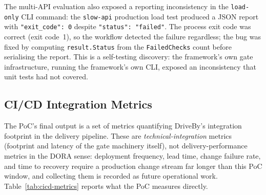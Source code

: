 The multi-API evaluation also exposed a reporting inconsistency in the \texttt{load-only} CLI command: the \texttt{slow-api} production load test produced a JSON report with \texttt{"exit\_code": 0} despite \texttt{"status": "failed"}. The process exit code was correct (exit code~1), so the workflow detected the failure regardless; the bug was fixed by computing \texttt{result.Status} from the \texttt{FailedChecks} count before serialising the report. This is a self-testing discovery: the framework's own gate infrastructure, running the framework's own CLI, exposed an inconsistency that unit tests had not covered.

\subsection{CI/CD Integration Metrics}
\label{sec:cicd-metrics}

The PoC's final output is a set of metrics quantifying DriveBy's integration footprint in the delivery pipeline. These are \emph{technical-integration} metrics (footprint and latency of the gate machinery itself), not delivery-performance metrics in the DORA sense: deployment frequency, lead time, change failure rate, and time to recovery require a production change stream far longer than this PoC window, and collecting them is recorded as future operational work. Table~\ref{tab:cicd-metrics} reports what the PoC measures directly.

